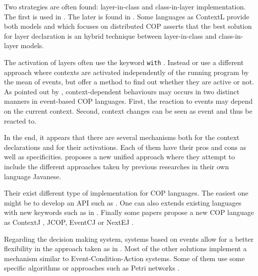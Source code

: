 \documentclass[a4paper]{article}
\begin{document}
Two strategies are often found: layer-in-class and class-in-layer implementation. The first is used in \cite{appeltauer_declarative_2012} \cite{appeltauer_dedicated_2008} \cite{appeltauer_improving_2009} \cite{kamina_eventcj:_2011} \cite{nunez_declarative_2009}. The later is found in \cite{lincke_open_2011}. Some languages as ContextL provide both models and \cite{ghezzi_context_2010} which focuses on distributed COP asserts that the best solution for layer declaration is an hybrid technique between layer-in-class and class-in-layer models. 

The activation of layers often use the keyword \lstinline|with| \cite{haupt_contextj:_2011} \cite{appeltauer_declarative_2013} \cite{kamina_eventcj:_2011}. Instead \cite{nunez_declarative_2009} or \cite{ghezzi_context_2010} use a different approach where contexts are activated independently of the running program by the mean of events, but offer a method to find out whether they are active or not. As pointed out by \cite{nunez_declarative_2009}, context-dependent behaviours may occurs in two distinct manners in event-based COP languages. First, the reaction to events may depend on the current context. Second, context changes can be seen as event and thus be reacted to. 

In the end, it appears that there are several mechanisms both for the context declarations and for their activations. Each of them have their pros and cons as well as specificities. \cite{kamina_unified_2013} proposes a new unified approach where they attempt to include the different approaches taken by previous researches in their own language Javanese.

Their exist different type of implementation for COP languages. The easiest one might be to develop an API such as \cite{appeltauer_dedicated_2008}. One can also extends existing languages with new keywords such as in \cite{clarke_semantics_2009} \cite{ghezzi_context_2010}. Finally some papers propose a new COP language as ContextJ \cite{haupt_contextj:_2011}, JCOP\cite{appeltauer_declarative_2013}, EventCJ \cite{kamina_eventcj:_2011} or NextEJ \cite{kamina_towards_2009}.

Regarding the decision making system, systems based on events allow for a better flexibility in the approach taken as in \cite{kamina_eventcj:_2011} \cite{kamina_towards_2009}. Most of the other solutions implement a mechanism similar to Event-Condition-Action systems. Some of them use some specific algorithms \cite{jayaram_context-oriented_2009} or approaches such as Petri networks \cite{cardozo_uniting_2012}.
\end{document}
